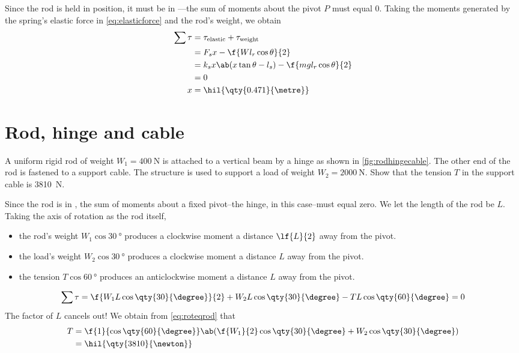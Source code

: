 Since the rod is held in position, it must be in ---the
sum of moments about the pivot \(P\) must equal \(0\).
Taking the moments generated by the spring's elastic force in
\cref{eq:elasticforce} and the rod's weight, we obtain
\begin{align*}
	\sum\tau & = \tau_{\text{elastic}} + \tau_{\text{weight}}        \\
	         & = {F}_sx - \f{Wl_r\cos\theta}{2}                      \\
	         & = k_sx\ab(x\tan\theta - l_s) - \f{mgl_r\cos\theta}{2} \\
	         & = 0                                                   \\
	x        & = \hil{\qty{0.471}{\metre}}
\end{align*}

\section{Rod, hinge and cable}
\begin{problem}
A uniform rigid rod of weight \({W}_1 = \qty{400}{\newton}\) is
attached to a vertical beam by a hinge as shown in \cref{fig:rodhingecable}.
The other end of the rod is fastened to a support cable. The structure is
used to support a load of weight \({W}_2 = \qty{2000}{\newton}\).
Show that the tension \({T}\) in the support cable is \qty{3810}{\newton}.
\end{problem}
Since the rod is in , the sum of moments about
a fixed pivot--the hinge, in this case--must equal zero. We let the
length of the rod be \(L\).
Taking the axis of rotation as the rod itself,
\begin{itemize}
	\item the rod's weight \({W_1}\cos\qty{30}{\degree}\) produces a
	      clockwise moment a distance \(\lf{L}{2}\) away from the pivot.
	\item the load's weight \({W_2}\cos\qty{30}{\degree}\) produces
	      a clockwise moment a distance \(L\) away from the pivot.
	\item the tension \({T}\cos\qty{60}{\degree}\) produces an
	      anticlockwise moment a distance \(L\) away from the pivot.
\end{itemize}
\begin{equation}
	\sum\tau = \f{{W}_1L\cos\qty{30}{\degree}}{2} +
	{W}_2L\cos\qty{30}{\degree} - {T}L\cos\qty{60}{\degree}=0
	\label{eq:roteqrod}
\end{equation}
The factor of \(L\) cancels out! We obtain from \cref{eq:roteqrod} that
\begin{align*}
	{T} & =
	\f{1}{\cos\qty{60}{\degree}}\ab(\f{{W}_1}{2}\cos\qty{30}{\degree}+{W}_2\cos\qty{30}{\degree})
	\\
	    & = \hil{\qty{3810}{\newton}}
\end{align*}

